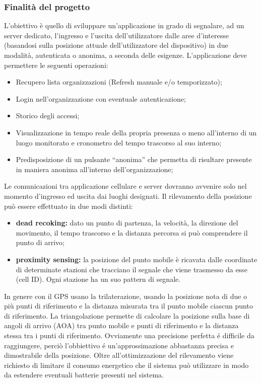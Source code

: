 	\subsubsection{Finalità del progetto}
		L'obiettivo è quello di sviluppare un’applicazione in grado di segnalare, ad un server dedicato, l’ingresso e l’uscita dell'utilizzatore dalle aree d’interesse (basandosi sulla posizione attuale dell'utilizzatore del dispositivo) in due modalità, autenticata o anonima, a seconda delle esigenze.
		L’applicazione deve permettere le seguenti operazioni:
		\begin{itemize}
			\item Recupero lista organizzazioni (Refresh manuale e/o temporizzato);
			\item Login nell'organizzazione con eventuale autenticazione;
			\item Storico degli accessi;
			\item Visualizzazione in tempo reale della propria presenza o meno all'interno di un luogo monitorato e cronometro del tempo trascorso al suo interno;
			\item Predisposizione di un pulsante ``anonima'' che permetta di risultare presente in maniera anonima all'interno dell'organizzazione;
		\end{itemize}
		Le comunicazioni tra applicazione cellulare e server dovranno avvenire solo nel momento d'ingresso ed uscita dai luoghi designati. Il rilevamento della posizione può essere effettuato in due modi distinti:
		\begin{itemize}
			\item \textbf{dead recoking:} dato un punto di partenza, la velocità, la direzione del movimento, il tempo trascorso e la distanza percorsa si può comprendere il punto di arrivo;
			\item \textbf{proximity sensing:} la posizione del punto mobile è ricavata dalle coordinate di determinate stazioni che tracciano il segnale che viene trasmesso da esse (cell ID). Ogni stazione ha un suo pattern di segnale.
		\end{itemize}
		In genere con il GPS usano la trilaterazione, usando la posizione nota di due o più punti di riferimento e la distanza misurata tra il punto mobile ciascun punto di riferimento. La triangolazione permette di calcolare la posizione sulla base di angoli di arrivo (AOA) tra punto mobile e punti di riferimento e la distanza stessa tra i punti di riferimento. Ovviamente una precisione perfetta é difficile da raggiungere, perciò l'obbiettivo é un'approssimazione abbastanza precisa e dimostrabile della posizione. Oltre all'ottimizzazione del rilevamento viene richiesto di limitare il consumo energetico che il sistema può utilizzare in modo da estendere eventuali batterie presenti nel sistema.

